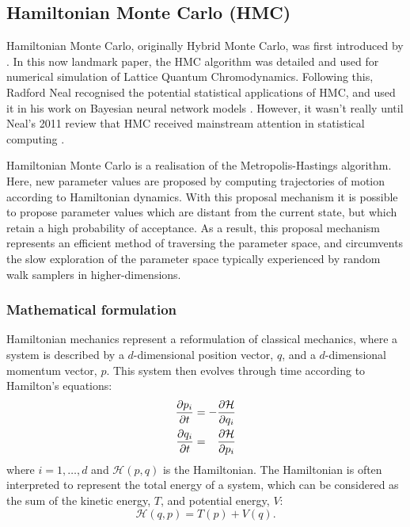 \subsection{Hamiltonian Monte Carlo (HMC)}

Hamiltonian Monte Carlo, originally Hybrid Monte Carlo, was first introduced by
\textcite{duane87}. In this now landmark paper, the HMC algorithm was detailed and used
for numerical simulation of Lattice Quantum Chromodynamics. Following this, Radford Neal
recognised the potential statistical applications of HMC, and used it in his work on
Bayesian neural network models \parencite{neal95}. However, it wasn't really until Neal's
2011 review \parencite{neal11} that HMC received mainstream attention in statistical
computing \parencite{betancourt18}.

Hamiltonian Monte Carlo is a realisation of the Metropolis-Hastings algorithm. Here,
new parameter values are proposed by computing trajectories of motion according to
Hamiltonian dynamics. With this proposal mechanism it is possible to propose parameter
values which are distant from the current state, but which retain a high probability of
acceptance. As a result, this proposal mechanism represents an efficient method of
traversing the parameter space, and circumvents the slow exploration of the parameter
space typically experienced by random walk samplers in higher-dimensions.

\subsubsection{Mathematical formulation}

Hamiltonian mechanics represent a reformulation of classical mechanics, where a system is
described by a $d$-dimensional position vector, $q$, and a $d$-dimensional momentum
vector, $p$. This system then evolves through time according to Hamilton's
equations:
\begin{align}
    \begin{split}
    \pdv{p_i}{t} &= - \pdv{\mathcal{H}}{q_i}\\
    \pdv{q_i}{t} &= \hphantom{-} \pdv{\mathcal{H}}{p_i}
    \end{split}
\end{align}
where $i=1,\ldots,d$ and $\mathcal{H}(p, q)$ is the Hamiltonian. The
Hamiltonian is often interpreted to represent the total energy of a system, which can be
considered as the sum of the kinetic energy, $T$, and potential energy, $V$:
\begin{equation}
    \label{eq:hamiltonian_decomp}
    \mathcal{H}(q, p) = T(p) + V(q).
\end{equation}

